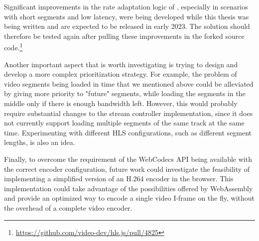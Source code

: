 Significant improvements in the rate adaptation logic of \hlsjs{}, especially in scenarios with short segments and low latency, were being developed while this thesis was being written and are expected to be released in early 2023. The solution should therefore be tested again after pulling these improvements in the forked source code.\footnote{\url{https://github.com/video-dev/hls.js/pull/4825}}

Another important aspect that is worth investigating is trying to design and develop a more complex prioritization strategy. For example, the problem of video segments being loaded in time that we mentioned above could be alleviated by giving more priority to "future" segments, while loading the segments in the middle only if there is enough bandwidth left. However, this would probably require substantial changes to the \hlsjs{} stream controller implementation, since it does not currently support loading multiple segments of the same track at the same time. Experimenting with different HLS configurations, such as different segment lengths, is also an idea.

Finally, to overcome the requirement of the WebCodecs API being available with the correct encoder configuration, future work could investigate the feasibility of implementing a simplified version of an H.264 encoder in the browser. This implementation could take advantage of the possibilities offered by WebAssembly and provide an optimized way to encode a single video I-frame on the fly, without the overhead of a complete video encoder.

